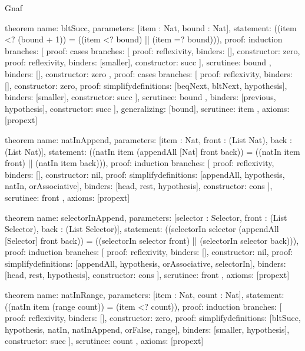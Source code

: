 \begin{lexlean}{Gnaf}
\begin{semanticmodule}
theorem{
  name: bltSucc,
  parameters: [item : Nat, bound : Nat],
  statement: ((item <? (bound + 1)) = ((item <? bound) || (item =? bound))),
  proof: induction{
    branches: [
      {
        proof: cases{
          branches: [
            {proof: reflexivity{}, binders: [], constructor: zero},
            {proof: reflexivity{}, binders: [smaller], constructor: succ}
          ],
          scrutinee: bound
        },
        binders: [],
        constructor: zero
      },
      {
        proof: cases{
          branches: [
            {proof: reflexivity{}, binders: [], constructor: zero},
            {
              proof: simplify{definitions: [beqNext, bltNext, hypothesis]},
              binders: [smaller],
              constructor: succ
            }
          ],
          scrutinee: bound
        },
        binders: [previous, hypothesis],
        constructor: succ
      }
    ],
    generalizing: [bound],
    scrutinee: item
  },
  axioms: [propext]
}

theorem{
  name: natInAppend,
  parameters: [item : Nat, front : (List Nat), back : (List Nat)],
  statement: ((natIn item (appendAll [Nat] front back)) = ((natIn item front) || (natIn item back))),
  proof: induction{
    branches: [
      {proof: reflexivity{}, binders: [], constructor: nil},
      {
        proof: simplify{definitions: [appendAll, hypothesis, natIn, orAssociative]},
        binders: [head, rest, hypothesis],
        constructor: cons
      }
    ],
    scrutinee: front
  },
  axioms: [propext]
}

theorem{
  name: selectorInAppend,
  parameters: [selector : Selector, front : (List Selector), back : (List Selector)],
  statement: ((selectorIn selector (appendAll [Selector] front back)) = ((selectorIn selector front) || (selectorIn selector back))),
  proof: induction{
    branches: [
      {proof: reflexivity{}, binders: [], constructor: nil},
      {
        proof: simplify{definitions: [appendAll, hypothesis, orAssociative, selectorIn]},
        binders: [head, rest, hypothesis],
        constructor: cons
      }
    ],
    scrutinee: front
  },
  axioms: [propext]
}

theorem{
  name: natInRange,
  parameters: [item : Nat, count : Nat],
  statement: ((natIn item (range count)) = (item <? count)),
  proof: induction{
    branches: [
      {proof: reflexivity{}, binders: [], constructor: zero},
      {
        proof: simplify{definitions: [bltSucc, hypothesis, natIn, natInAppend, orFalse, range]},
        binders: [smaller, hypothesis],
        constructor: succ
      }
    ],
    scrutinee: count
  },
  axioms: [propext]
}


\end{semanticmodule}
\end{lexlean}
